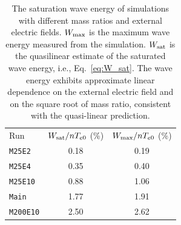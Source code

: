 \documentclass[%
 reprint,
 amsmath,
 amssymb,
 aps,
 prx,
floatfix,
superscriptaddress
]{revtex4-2}
\begin{document}
\begin{table}[b]
\renewcommand\arraystretch{1.2}
\caption{\label{tab:saturation} The saturation wave energy of simulations with different mass ratios and external electric fields.  $W_{\rm{max}}$ is the maximum wave energy measured from the simulation. $W_{\rm{sat}}$ is the quasilinear estimate of the saturated wave energy, i.e.,  Eq.~\eqref{eq:W_sat}.
The wave energy exhibits approximate linear dependence on the external electric field and on the square root of mass ratio, consistent with the quasi-linear prediction. }
\begin{ruledtabular}
\begin{tabular}{lcc}
Run & $W_{\rm{sat}}/nT_{e0}$ (\%) & $W_{\rm{{max}}}/nT_{e0}$ (\%) \\
\colrule
 {\tt M25E2} & 0.18 & 0.19\\
 {\tt M25E4} & 0.35 & 0.40\\
 {\tt M25E10} & 0.88 & 1.06\\
 {\tt Main}  & 1.77 & 1.91\\
 {\tt M200E10} & 2.50 & 2.62\\
\end{tabular}
\end{ruledtabular}
\end{table}
%
\end{document}
